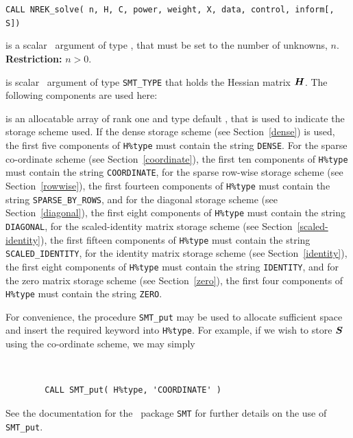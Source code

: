 \documentclass{galahad}
\newcommand{\packagename}{NREK}
\begin{document}
\vspace*{2mm}
\hskip0.5in
{\tt CALL \packagename\_solve( n, H, C, power, weight, X, data, control, inform[, S])}

\begin{description}

 is a scalar \intentin\ argument of type \integer, that must be
set to the number of unknowns, $n$. {\bf Restriction: } $n  >  0$.

 is scalar \intentin\ argument of type {\tt SMT\_TYPE}
that holds the Hessian matrix ${\bm{H}}$. The following components
are used here:

\begin{description}

 is an allocatable array of rank one and type default
\character, that
is used to indicate the storage scheme used. If the dense storage scheme
(see Section~\ref{dense}) is used,
the first five components of {\tt H\%type} must contain the
string {\tt DENSE}.
For the sparse co-ordinate scheme (see Section~\ref{coordinate}),
the first ten components of {\tt H\%type} must contain the
string {\tt COORDINATE},
for the sparse row-wise storage scheme (see Section~\ref{rowwise}),
the first fourteen components of {\tt H\%type} must contain the
string {\tt SPARSE\_BY\_ROWS},
and for the diagonal storage scheme (see Section~\ref{diagonal}),
the first eight components of {\tt H\%type} must contain the
string {\tt DIAGONAL},
for the scaled-identity matrix storage scheme
(see Section~\ref{scaled-identity}),
the first fifteen components of {\tt H\%type} must contain the
string {\tt SCALED\_IDENTITY},
for the identity matrix storage scheme
(see Section~\ref{identity}),
the first eight components of {\tt H\%type} must contain the
string {\tt IDENTITY}, and
for the zero matrix storage scheme
(see Section~\ref{zero}),
the first four components of {\tt H\%type} must contain the
string {\tt ZERO}.

For convenience, the procedure {\tt SMT\_put}
may be used to allocate sufficient space and insert the required keyword
into {\tt H\%type}.
For example, if we wish to store ${\bm{S}}$ using the co-ordinate scheme,
we may simply
{\tt
\begin{verbatim}
        CALL SMT_put( H%type, 'COORDINATE' )
\end{verbatim}
}
\noindent
See the documentation for the \galahad\ package {\tt SMT}
for further details on the use of {\tt SMT\_put}.


\end{description}
\end{description}
\end{document}
